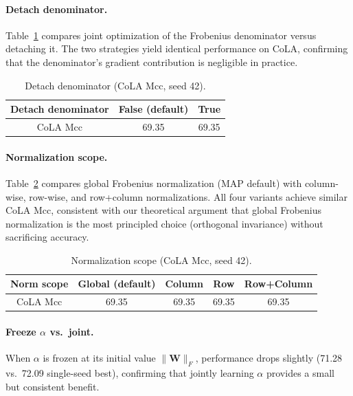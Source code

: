 \paragraph{Detach denominator.}
Table~\ref{tab:abl-detach} compares joint optimization of the Frobenius denominator versus detaching it.
The two strategies yield identical performance on CoLA, confirming that the denominator's gradient contribution is negligible in practice.

\begin{table}[h]
\centering
\caption{Detach denominator (CoLA Mcc, seed 42).}
\setlength{\tabcolsep}{6mm}
\begin{tabular}{c|cc}
\toprule
Detach denominator & False (default) & True \\
\midrule
CoLA Mcc & 69.35 & 69.35 \\
\bottomrule
\end{tabular}
\label{tab:abl-detach}
\end{table}

\paragraph{Normalization scope.}
Table~\ref{tab:abl-norm} compares global Frobenius normalization (MAP default) with column-wise, row-wise, and row+column normalizations.
All four variants achieve similar CoLA Mcc, consistent with our theoretical argument that global Frobenius normalization is the most principled choice (orthogonal invariance) without sacrificing accuracy.

\begin{table}[h]
\centering
\caption{Normalization scope (CoLA Mcc, seed 42).}
\setlength{\tabcolsep}{3mm}
\begin{tabular}{c|cccc}
\toprule
Norm scope & Global (default) & Column & Row & Row+Column \\
\midrule
CoLA Mcc & 69.35 & 69.35 & 69.35 & 69.35 \\
\bottomrule
\end{tabular}
\label{tab:abl-norm}
\end{table}

\paragraph{Freeze $\alpha$ vs.\ joint.}
When $\alpha$ is frozen at its initial value $\|\mathbf{W}\|_F$, performance drops slightly (71.28 vs.\ 72.09 single-seed best), confirming that jointly learning $\alpha$ provides a small but consistent benefit.

